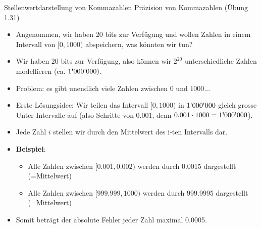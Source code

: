 \begin{frame}{Stellenwertdarstellung von Kommazahlen}
Präzision von Kommazahlen (Übung 1.31)
\begin{itemize}[<+->]
    \item Angenommen, wir haben 20 bits zur Verfügung und wollen Zahlen in einem Intervall von $[0, 1000)$ abspeichern, was könnten wir tun?
    \item Wir haben 20 bits zur Verfügung, also können wir $2^{20}$ unterschiedliche Zahlen modellieren (ca. $1\text{\textquotesingle}000\text{\textquotesingle}000)$. 
    \item Problem: es gibt unendlich viele Zahlen zwischen $0$ und $1000$...
    \item Erste Lösungsidee: Wir teilen das Intervall $[0,1000)$ in $1\text{\textquotesingle}000\text{\textquotesingle}000$ gleich grosse Unter-Intervalle auf (also Schritte von $0.001$, denn $0.001\cdot1000=1\text{\textquotesingle} 000\text{\textquotesingle}000$).
    \item Jede Zahl $i$ stellen wir durch den Mittelwert des i-ten Intervalls dar.
    \item \textbf{Beispiel}:
    \begin{itemize}
        \item Alle Zahlen zwischen $[0.001, 0.002)$ werden durch 0.0015 dargestellt (=Mittelwert)
        \item Alle Zahlen zwischen $[999.999, 1000)$ werden durch 999.9995 dargestellt (=Mittelwert)
    \end{itemize}
    \item Somit beträgt der absolute Fehler jeder Zahl maximal 0.0005.
\end{itemize}
\end{frame}

